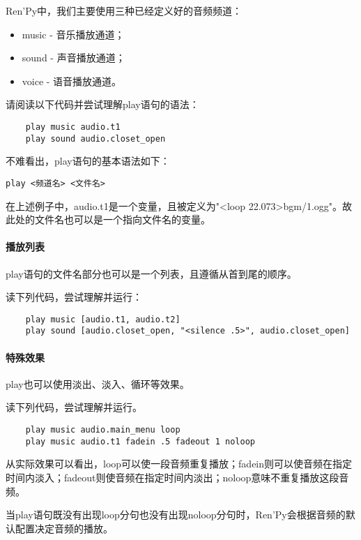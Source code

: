 Ren'Py中，我们主要使用三种已经定义好的音频频道：

\begin{itemize}
    \item music - 音乐播放通道；
    \item sound - 声音播放通道；
    \item voice - 语音播放通道。 
\end{itemize}

请阅读以下代码并尝试理解play语句的语法：

\begin{lstlisting}
    play music audio.t1
    play sound audio.closet_open
\end{lstlisting}

不难看出，play语句的基本语法如下：
\begin{lstlisting}[numbers=none]
play <频道名> <文件名>
\end{lstlisting}

\begin{ExtraKnowledge}
    在上述例子中，audio.t1是一个变量，且被定义为"<loop 22.073>bgm/1.ogg"。故此处的文件名也可以是一个指向文件名的变量。
\end{ExtraKnowledge}

\paragraph{播放列表}
play语句的文件名部分也可以是一个列表，且遵循从首到尾的顺序。

读下列代码，尝试理解并运行：
\begin{lstlisting}
    play music [audio.t1, audio.t2]
    play sound [audio.closet_open, "<silence .5>", audio.closet_open]
\end{lstlisting}


\paragraph{特殊效果}
play也可以使用淡出、淡入、循环等效果。

读下列代码，尝试理解并运行。
\begin{lstlisting}
    play music audio.main_menu loop
    play music audio.t1 fadein .5 fadeout 1 noloop
\end{lstlisting}

从实际效果可以看出，loop可以使一段音频重复播放；fadein则可以使音频在指定时间内淡入；fadeout则使音频在指定时间内淡出；noloop意味不重复播放这段音频。

\begin{ExtraKnowledge}
    当play语句既没有出现loop分句也没有出现noloop分句时，Ren'Py会根据音频的默认配置决定音频的播放。
\end{ExtraKnowledge}

